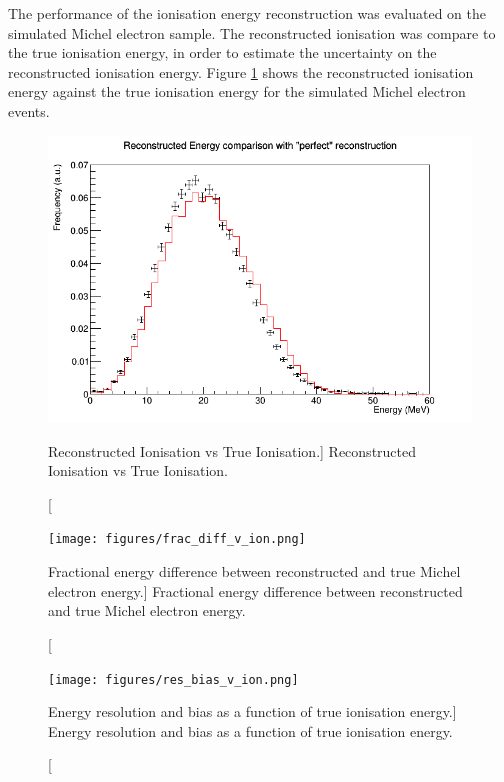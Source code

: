 The performance of the ionisation energy reconstruction was evaluated on the
simulated Michel electron sample. The reconstructed ionisation was compare to
the true ionisation energy, in order to estimate the uncertainty on the
reconstructed ionisation energy. Figure \ref{fig:reco_v_ion} shows the
reconstructed ionisation energy against the true ionisation energy for the
simulated Michel electron events. 
\begin{figure}
	\centering
	\includegraphics[width=\textwidth, height=0.68\textwidth]{figures/reco_v_ion.png}
	\caption
	[Reconstructed Ionisation vs True Ionisation.]
	{Reconstructed Ionisation vs True Ionisation.}
	\label{fig:reco_v_ion}
\end{figure}


\begin{figure}
	\centering
	\texttt{[image: figures/frac\_diff\_v\_ion.png]}
	\caption
	[Fractional energy difference between reconstructed and true Michel electron
	energy.]
	{Fractional energy difference between reconstructed and true Michel electron
	energy.}
	\label{fig:frac_diff_ion}
\end{figure}

\begin{figure}
	\centering
	\texttt{[image: figures/res\_bias\_v\_ion.png]}
	\caption
	[Energy resolution and bias as a function of true ionisation energy.]
	{Energy resolution and bias as a function of true ionisation energy.}
	\label{fig:res_and_bias_ion}
\end{figure}


